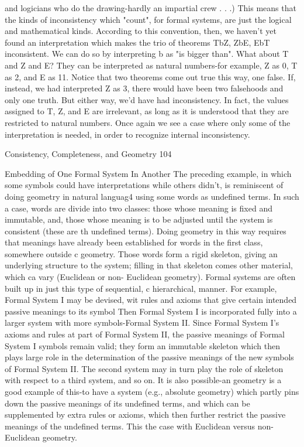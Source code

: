and logicians who do the drawing-hardly an impartial crew . . .) This means that the kinds
of inconsistency which "count", for formal systems, are just the logical and mathematical
kinds. According to this convention, then, we haven't yet found an interpretation which
makes the trio of theorems TbZ, ZbE, EbT inconsistent. We can do so by interpreting b
as "is bigger than". What about T and Z and E? They can be interpreted as natural
numbers-for example, Z as 0, T as 2, and E as 11. Notice that two theorems come out
true this way, one false. If, instead, we had interpreted Z as 3, there would have been two
falsehoods and only one truth. But either way, we'd have had inconsistency. In fact, the
values assigned to T, Z, and E are irrelevant, as long as it is understood that they are
restricted to natural numbers. Once again we see a case where only some of the
interpretation is needed, in order to recognize internal inconsistency.




Consistency, Completeness, and Geometry                                                   104

                Embedding of One Formal System In Another
The preceding example, in which some symbols could have interpretations while others
didn't, is reminiscent of doing geometry in natural languag4 using some words as
undefined terms. In such a case, words are divide into two classes: those whose meaning
is fixed and immutable, and, those whose meaning is to be adjusted until the system is
consistent (these are th undefined terms). Doing geometry in this way requires that
meanings have already been established for words in the first class, somewhere outside c
geometry. Those words form a rigid skeleton, giving an underlying structure to the
system; filling in that skeleton comes other material, which ca vary (Euclidean or non-
Euclidean geometry).
        Formal systems are often built up in just this type of sequential, c hierarchical,
manner. For example, Formal System I may be devised, wit rules and axioms that give
certain intended passive meanings to its symbol Then Formal System I is incorporated
fully into a larger system with more symbols-Formal System II. Since Formal System I's
axioms and rules at part of Formal System II, the passive meanings of Formal System I
symbols remain valid; they form an immutable skeleton which then plays large role in the
determination of the passive meanings of the new symbols of Formal System II. The
second system may in turn play the role of skeleton with respect to a third system, and so
on. It is also possible-an geometry is a good example of this-to have a system (e.g.,
absolute geometry) which partly pins down the passive meanings of its undefined terms,
and which can be supplemented by extra rules or axioms, which then further restrict the
passive meanings of the undefined terms. This the case with Euclidean versus non-
Euclidean geometry.

